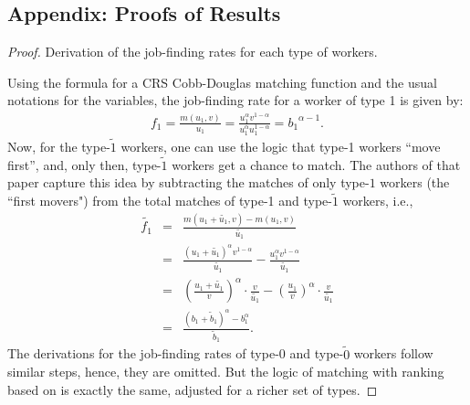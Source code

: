 \documentclass[12pt]{article} %
\theoremstyle{definition}
\begin{document}

\newpage


\setlength{\bibsep}{0pt}
%

 

\newpage

\begin{appendix}

\renewcommand{\theequation}{A.\arabic{equation}}

\setcounter{equation}{0}

\section{Appendix: Proofs of Results}\label{section appendix proofs}
\begin{proof}{Derivation of the job-finding rates for each type of workers.}

\noindent Using the formula for a CRS Cobb-Douglas matching function and the usual notations for the variables, the job-finding rate for a worker of type 1 is given by: 
\begin{eqnarray*}
     f_1 = \frac{m(u_1,v)}{u_1} =  \frac{u_1^\alpha v^{1-\alpha}}{u_1^\alpha u_1^{1-\alpha}}  = {b_1}^{\alpha-1}.  
\end{eqnarray*}
Now, for the type-$\tilde{1}$ workers, one can use the \cite{petrongolo2001looking} logic that type-1 workers “move first”, and, only then, type-$\tilde{1}$ workers get a chance to match. The authors of that paper capture this idea by subtracting the matches of only type-${1}$ workers (the ``first movers") from the total matches of type-1 and type-$\tilde{1}$ workers, i.e.,  
\begin{eqnarray*}
     \tilde{f_1} &=& \frac{m(u_1+\tilde{u_1},v)-m(u_1,v)}{\tilde{u_1}} \\
      &=& \frac{(u_1+\tilde{u_1})^\alpha v^{1-\alpha}}{\tilde{u_1}} -\frac{u_1^\alpha v^{1-\alpha}}{\tilde{u_1}} \\
        &=& \left(\frac{u_1+\tilde{u_1}}{v}\right)^{\alpha} \cdot \frac{v}{\tilde{u_1}} - \left(\frac{u_1}{v}\right)^{\alpha}\cdot  \frac{v}{\tilde{u_1}}  \\
        &=& \frac{(b_1+\tilde{b}_1)^\alpha - b_1^\alpha}{\tilde{b}_1}.
\end{eqnarray*}The derivations for the job-finding rates of type-0 and type-$\tilde{0}$ workers follow similar steps, hence, they are omitted. But the logic of matching with ranking based on \cite{petrongolo2001looking} is exactly the same, adjusted for a richer set of types. 


\end{proof}
\end{appendix}
\end{document}
